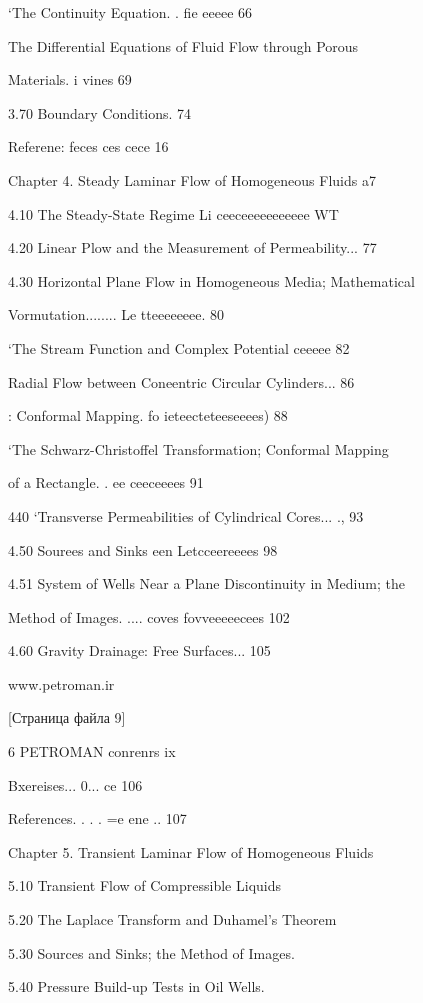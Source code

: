 \documentclass[
  11pt,
]{article}
\begin{document}
`The Continuity Equation. . fie eeeee 66\par
The Differential Equations of Fluid Flow through Porous\par
Materials. i vines 69\par
3.70 Boundary Conditions. 74\par
Referene: feces ces cece 16\par
Chapter 4. Steady Laminar Flow of Homogeneous Fluids a7\par
4.10 The Steady-State Regime Li ceeceeeeeeeeeee WT\par
4.20 Linear Plow and the Measurement of Permeability... 77\par
4.30 Horizontal Plane Flow in Homogeneous Media; Mathematical\par
Vormutation........ Le tteeeeeeee. 80\par
`The Stream Function and Complex Potential ceeeee 82\par
Radial Flow between Coneentric Circular Cylinders... 86\par
: Conformal Mapping. fo ieteecteteeseeees) 88\par
`The Schwarz-Christoffel Transformation; Conformal Mapping\par
of a Rectangle. . ee ceeceeees 91\par
440 `Transverse Permeabilities of Cylindrical Cores... ., 93\par
4.50 Sourees and Sinks een Letcceereeees 98\par
4.51 System of Wells Near a Plane Discontinuity in Medium; the\par
Method of Images. .... coves fovveeeeecees 102\par
4.60 Gravity Drainage: Free Surfaces... 105\par
\smallskip
www.petroman.ir\par
\smallskip
{[}Страница файла 9{]}\par
6 PETROMAN conrenrs ix\par
\smallskip
Bxereises... 0... ce 106\par
References. . . . =e ene .. 107\par
\smallskip
Chapter 5. Transient Laminar Flow of Homogeneous Fluids\par
5.10 Transient Flow of Compressible Liquids\par
5.20 The Laplace Transform and Duhamel's Theorem\par
5.30 Sources and Sinks; the Method of Images.\par
5.40 Pressure Build-up Tests in Oil Wells.\par
\end{document}
